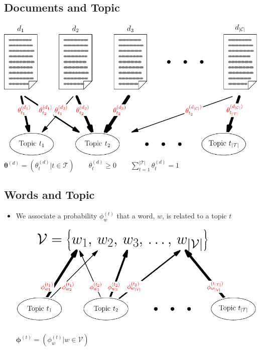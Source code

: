 
\begin{slide}
\section[-2]{Documents and Topic}
\begin{center}
  \includegraphics[width=\linewidth]{topicModelWtoT}\pause\\
  $\bm{\theta}^{(d)} = (\theta^{(d)}_t | t \in \mathcal{T}) \qquad
  \theta^{(d)}_t \geq 0 \qquad \sum\limits_{t=1}^{|\mathcal{T}|}
    \theta^{(d)}_t =1$
\end{center}
\end{slide}


\begin{slide}
\section{Words and Topic}

\begin{PauseHighLight}
  \begin{itemize}
  \item We associate a probability $\phi^{(t)}_w$ that a word, $w$, is
    related to a topic $t$\pause
    \begin{center}
      \includegraphics[width=0.7\linewidth]{topicModel}\\\ \\
      $\bm{\phi}^{(t)} = (\phi^{(t)}_w | w \in \mathcal{V})$\pause
    \end{center}
  \end{itemize}
\end{PauseHighLight}

\end{slide}


